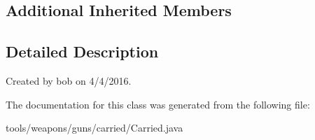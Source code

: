 \subsection*{Additional Inherited Members}


\subsection{Detailed Description}
Created by bob on 4/4/2016. 

The documentation for this class was generated from the following file\+:\begin{DoxyCompactItemize}
\item 
tools/weapons/guns/carried/Carried.\+java\end{DoxyCompactItemize}
